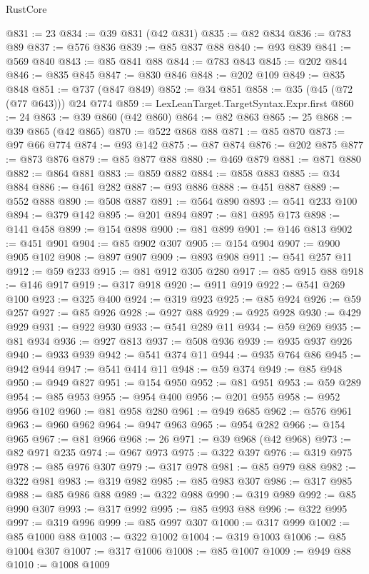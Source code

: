 \begin{lexlean}{RustCore}
\begin{coremodule}
@831 := 23
@834 := @39 @831 (@42 @831)
@835 := @82 @834
@836 := @783 @89
@837 := @576 @836
@839 := @85 @837 @88
@840 := @93 @839
@841 := @569 @840
@843 := @85 @841 @88
@844 := @783 @843
@845 := @202 @844
@846 := @835 @845
@847 := @830 @846
@848 := @202 @109
@849 := @835 @848
@851 := @737 (@847 @849)
@852 := @34 @851
@858 := @35 (@45 (@72 (@77 @643))) @24 @774
@859 := LexLeanTarget.TargetSyntax.Expr.first
@860 := 24
@863 := @39 @860 (@42 @860)
@864 := @82 @863
@865 := 25
@868 := @39 @865 (@42 @865)
@870 := @522 @868 @88
@871 := @85 @870
@873 := @97 @66 @774
@874 := @93 @142
@875 := @87 @874
@876 := @202 @875
@877 := @873 @876
@879 := @85 @877 @88
@880 := @469 @879
@881 := @871 @880
@882 := @864 @881
@883 := @859 @882
@884 := @858 @883
@885 := @34 @884
@886 := @461 @282
@887 := @93 @886
@888 := @451 @887
@889 := @552 @888
@890 := @508 @887
@891 := @564 @890
@893 := @541 @233 @100
@894 := @379 @142
@895 := @201 @894
@897 := @81 @895 @173
@898 := @141 @458
@899 := @154 @898
@900 := @81 @899
@901 := @146 @813
@902 := @451 @901
@904 := @85 @902 @307
@905 := @154 @904
@907 := @900 @905 @102
@908 := @897 @907
@909 := @893 @908
@911 := @541 @257 @11
@912 := @59 @233
@915 := @81 @912 @305 @280
@917 := @85 @915 @88
@918 := @146 @917
@919 := @317 @918
@920 := @911 @919
@922 := @541 @269 @100
@923 := @325 @400
@924 := @319 @923
@925 := @85 @924
@926 := @59 @257
@927 := @85 @926
@928 := @927 @88
@929 := @925 @928
@930 := @429 @929
@931 := @922 @930
@933 := @541 @289 @11
@934 := @59 @269
@935 := @81 @934
@936 := @927 @813
@937 := @508 @936
@939 := @935 @937 @926
@940 := @933 @939
@942 := @541 @374 @11
@944 := @935 @764 @86
@945 := @942 @944
@947 := @541 @414 @11
@948 := @59 @374
@949 := @85 @948
@950 := @949 @827
@951 := @154 @950
@952 := @81 @951
@953 := @59 @289
@954 := @85 @953
@955 := @954 @400
@956 := @201 @955
@958 := @952 @956 @102
@960 := @81 @958 @280
@961 := @949 @685
@962 := @576 @961
@963 := @960 @962
@964 := @947 @963
@965 := @954 @282
@966 := @154 @965
@967 := @81 @966
@968 := 26
@971 := @39 @968 (@42 @968)
@973 := @82 @971 @235
@974 := @967 @973
@975 := @322 @397
@976 := @319 @975
@978 := @85 @976 @307
@979 := @317 @978
@981 := @85 @979 @88
@982 := @322 @981
@983 := @319 @982
@985 := @85 @983 @307
@986 := @317 @985
@988 := @85 @986 @88
@989 := @322 @988
@990 := @319 @989
@992 := @85 @990 @307
@993 := @317 @992
@995 := @85 @993 @88
@996 := @322 @995
@997 := @319 @996
@999 := @85 @997 @307
@1000 := @317 @999
@1002 := @85 @1000 @88
@1003 := @322 @1002
@1004 := @319 @1003
@1006 := @85 @1004 @307
@1007 := @317 @1006
@1008 := @85 @1007
@1009 := @949 @88
@1010 := @1008 @1009

\end{coremodule}
\end{lexlean}
